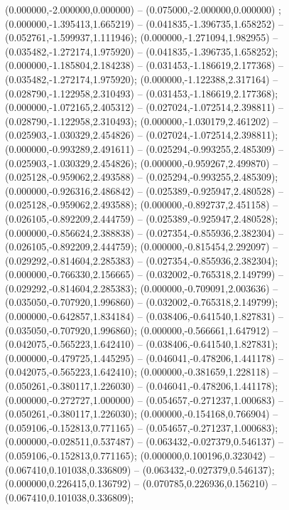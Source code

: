  (0.000000,-2.000000,0.000000) -- (0.075000,-2.000000,0.000000) ;
 (0.000000,-1.395413,1.665219) -- (0.041835,-1.396735,1.658252) -- (0.052761,-1.599937,1.111946);
 (0.000000,-1.271094,1.982955) -- (0.035482,-1.272174,1.975920) -- (0.041835,-1.396735,1.658252);
 (0.000000,-1.185804,2.184238) -- (0.031453,-1.186619,2.177368) -- (0.035482,-1.272174,1.975920);
 (0.000000,-1.122388,2.317164) -- (0.028790,-1.122958,2.310493) -- (0.031453,-1.186619,2.177368);
 (0.000000,-1.072165,2.405312) -- (0.027024,-1.072514,2.398811) -- (0.028790,-1.122958,2.310493);
 (0.000000,-1.030179,2.461202) -- (0.025903,-1.030329,2.454826) -- (0.027024,-1.072514,2.398811);
 (0.000000,-0.993289,2.491611) -- (0.025294,-0.993255,2.485309) -- (0.025903,-1.030329,2.454826);
 (0.000000,-0.959267,2.499870) -- (0.025128,-0.959062,2.493588) -- (0.025294,-0.993255,2.485309);
 (0.000000,-0.926316,2.486842) -- (0.025389,-0.925947,2.480528) -- (0.025128,-0.959062,2.493588);
 (0.000000,-0.892737,2.451158) -- (0.026105,-0.892209,2.444759) -- (0.025389,-0.925947,2.480528);
 (0.000000,-0.856624,2.388838) -- (0.027354,-0.855936,2.382304) -- (0.026105,-0.892209,2.444759);
 (0.000000,-0.815454,2.292097) -- (0.029292,-0.814604,2.285383) -- (0.027354,-0.855936,2.382304);
 (0.000000,-0.766330,2.156665) -- (0.032002,-0.765318,2.149799) -- (0.029292,-0.814604,2.285383);
 (0.000000,-0.709091,2.003636) -- (0.035050,-0.707920,1.996860) -- (0.032002,-0.765318,2.149799);
 (0.000000,-0.642857,1.834184) -- (0.038406,-0.641540,1.827831) -- (0.035050,-0.707920,1.996860);
 (0.000000,-0.566661,1.647912) -- (0.042075,-0.565223,1.642410) -- (0.038406,-0.641540,1.827831);
 (0.000000,-0.479725,1.445295) -- (0.046041,-0.478206,1.441178) -- (0.042075,-0.565223,1.642410);
 (0.000000,-0.381659,1.228118) -- (0.050261,-0.380117,1.226030) -- (0.046041,-0.478206,1.441178);
 (0.000000,-0.272727,1.000000) -- (0.054657,-0.271237,1.000683) -- (0.050261,-0.380117,1.226030);
 (0.000000,-0.154168,0.766904) -- (0.059106,-0.152813,0.771165) -- (0.054657,-0.271237,1.000683);
 (0.000000,-0.028511,0.537487) -- (0.063432,-0.027379,0.546137) -- (0.059106,-0.152813,0.771165);
 (0.000000,0.100196,0.323042) -- (0.067410,0.101038,0.336809) -- (0.063432,-0.027379,0.546137);
 (0.000000,0.226415,0.136792) -- (0.070785,0.226936,0.156210) -- (0.067410,0.101038,0.336809);
